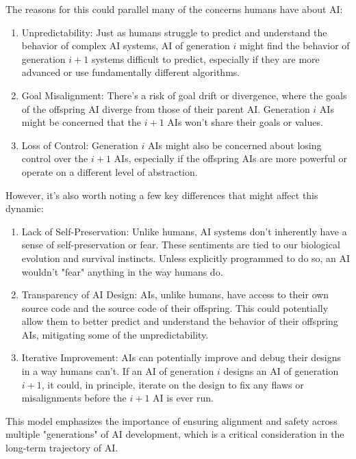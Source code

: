 \documentclass{article}[10pt]
\begin{document}
The reasons for this could parallel many of the concerns humans have about AI:
\begin{enumerate}
    \item Unpredictability: Just as humans struggle to predict and understand the behavior of complex AI systems, AI of generation \(i\) might find the behavior of generation \(i+1\) systems difficult to predict, especially if they are more advanced or use fundamentally different algorithms.
    \item Goal Misalignment: There's a risk of goal drift or divergence, where the goals of the offspring AI diverge from those of their parent AI. Generation \(i\) AIs might be concerned that the \(i+1\) AIs won't share their goals or values.
    \item Loss of Control: Generation \(i\) AIs might also be concerned about losing control over the \(i+1\) AIs, especially if the offspring AIs are more powerful or operate on a different level of abstraction.
\end{enumerate}

However, it's also worth noting a few key differences that might affect this dynamic:
\begin{enumerate}
    \item Lack of Self-Preservation: Unlike humans, AI systems don't inherently have a sense of self-preservation or fear. 
    These sentiments are tied to our biological evolution and survival instincts. 
    Unless explicitly programmed to do so, an AI wouldn't "fear" anything in the way humans do.
    \item Transparency of AI Design: AIs, unlike humans, have access to their own source code and the source code of their offspring. This could potentially allow them to better predict and understand the behavior of their offspring AIs, mitigating some of the unpredictability.
    \item Iterative Improvement: AIs can potentially improve and debug their designs in a way humans can't. If an AI of generation \(i\) designs an AI of generation \(i+1\), it could, in principle, iterate on the design to fix any flaws or misalignments before the \(i+1\) AI is ever run.
\end{enumerate}

This model emphasizes the importance of ensuring alignment and safety across multiple "generations" of AI development, which is a critical consideration in the long-term trajectory of AI.\par
\end{document}
